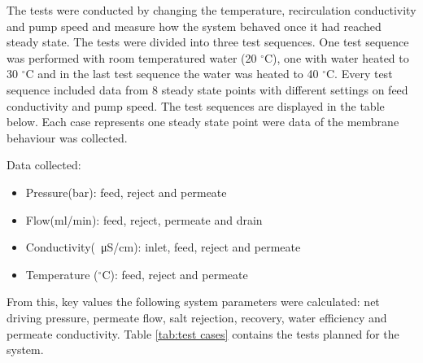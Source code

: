 The tests were conducted by changing the temperature, recirculation conductivity and pump speed and measure how the system behaved once it had reached steady state. The tests were divided into three test sequences. One test sequence was performed with room temperatured water (20  $^{\circ}$C), one with water heated to 30  $^{\circ}$C and in the last test sequence the water was heated to 40  $^{\circ}$C. Every test sequence included data from 8 steady state points with different settings on feed conductivity and pump speed. The test sequences are displayed in the table below. Each case represents one steady state point were data of the membrane behaviour was collected. 

Data collected:

\begin{itemize}
\item Pressure(bar): feed, reject and permeate
\item Flow(ml/min): feed, reject, permeate and drain
\item Conductivity(\SI{}{\micro\siemens}/cm): inlet, feed, reject and permeate
\item Temperature ($^\circ$C): feed, reject and permeate
\end{itemize}

From this, key values the following system parameters were calculated: net driving pressure, permeate flow, salt rejection, recovery, water efficiency and permeate conductivity. Table  \ref{tab:test cases} contains the tests planned for the system.

\newpage

